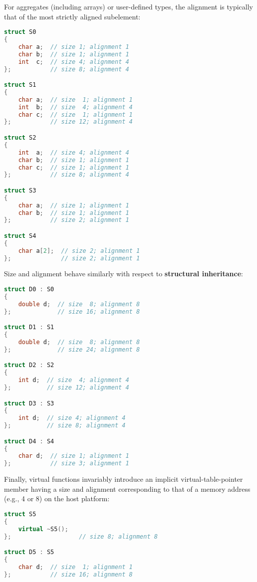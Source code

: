 \noindent For aggregates (including arrays) or user-defined types, the alignment
is typically that of the most strictly aligned subelement:

\begin{lstlisting}[language=C++]
struct S0
{
    char a;  // size 1; alignment 1
    char b;  // size 1; alignment 1
    int  c;  // size 4; alignment 4
};           // size 8; alignment 4

struct S1
{
    char a;  // size  1; alignment 1
    int  b;  // size  4; alignment 4
    char c;  // size  1; alignment 1
};           // size 12; alignment 4

struct S2
{
    int  a;  // size 4; alignment 4
    char b;  // size 1; alignment 1
    char c;  // size 1; alignment 1
};           // size 8; alignment 4

struct S3
{
    char a;  // size 1; alignment 1
    char b;  // size 1; alignment 1
};           // size 2; alignment 1

struct S4
{
    char a[2];  // size 2; alignment 1
};              // size 2; alignment 1
\end{lstlisting}

\noindent Size and alignment behave similarly with respect to \textbf{structural
inheritance}:

\begin{lstlisting}[language=C++]
struct D0 : S0
{
    double d;  // size  8; alignment 8
};             // size 16; alignment 8

struct D1 : S1
{
    double d;  // size  8; alignment 8
};             // size 24; alignment 8

struct D2 : S2
{
    int d;  // size  4; alignment 4
};          // size 12; alignment 4

struct D3 : S3
{
    int d;  // size 4; alignment 4
};          // size 8; alignment 4

struct D4 : S4
{
    char d;  // size 1; alignment 1
};           // size 3; alignment 1
\end{lstlisting}

\noindent Finally, virtual functions invariably introduce an implicit
virtual-table-pointer member having a size and alignment corresponding
to that of a memory address (e.g., 4 or 8) on the host platform:

\begin{lstlisting}[language=C++]
struct S5
{
    virtual ~S5();
};                   // size 8; alignment 8

struct D5 : S5
{
    char d;  // size  1; alignment 1
};           // size 16; alignment 8
\end{lstlisting}



